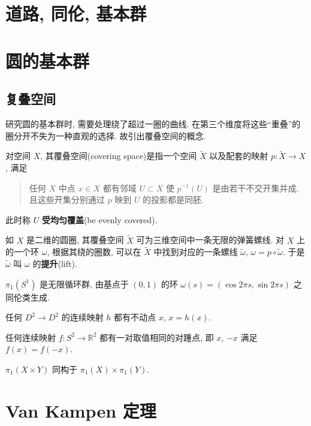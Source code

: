 \section{道路, 同伦, 基本群}

\section{圆的基本群}

\subsection{复叠空间}
研究圆的基本群时, 需要处理绕了超过一圈的曲线. 在第三个维度将这些``重叠''的圈分开不失为一种直观的选择. 故引出覆叠空间的概念.

对空间 $X$, 其覆叠空间(covering space)是指一个空间 $\tilde{X}$ 以及配套的映射 $p: \tilde{X} \rightarrow X$, 满足
\begin{quote}
    任何 $X$ 中点 $x \in X$ 都有邻域 $U \subset X$ 使 $p^{-1}(U)$ 是由若干不交开集并成, 且这些开集分别通过 $p$ 映到 $U$ 的投影都是同胚.
\end{quote}
此时称 $U$ \textbf{受均匀覆盖}(be evenly covered).

如 $X$ 是二维的圆圈, 其覆叠空间 $\tilde{X}$ 可为三维空间中一条无限的弹簧螺线. 对 $X$ 上的一个环 $\omega$, 根据其绕的圈数, 可以在 $\tilde{X}$ 中找到对应的一条螺线 $\tilde{\omega}$, $\omega = p \circ \tilde{\omega}$. 于是 $\tilde{\omega}$ 叫 $\omega$ 的\textbf{提升}(lift). 

\begin{theorem}
    $\pi_1(S^1)$ 是无限循环群, 由基点于 $(0, 1)$ 的环 $\omega(s) = (\cos 2\pi s, \sin 2\pi s)$ 之同伦类生成.
\end{theorem}

\begin{theorem}
    任何 $D^2 \rightarrow D^2$ 的连续映射 $h$ 都有不动点 $x$, $x = h(x)$.
\end{theorem}

\begin{theorem}
    任何连续映射 $f: S^2 \rightarrow \mathbb{R}^2$ 都有一对取值相同的对踵点, 即 $x$, $-x$ 满足 $f(x) = f(-x)$.
\end{theorem}

\begin{proposition}
    $\pi_1(X \times Y)$ 同构于 $\pi_1(X) \times \pi_1(Y)$.
\end{proposition}

\section{Van Kampen 定理}

